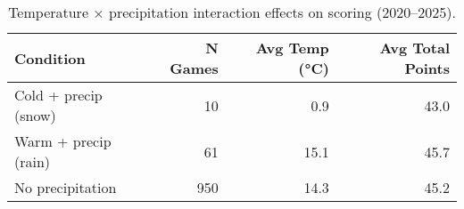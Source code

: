 \begin{table}[t]
  \centering
  \small
  \caption[Precipitation interaction effects]{Temperature × precipitation interaction effects on scoring (2020--2025).}
  \label{tab:precip-interaction}
  \setlength{\tabcolsep}{4pt}\renewcommand{\arraystretch}{1.12}
  \begin{tabular}{@{} l r r r @{} }
    \toprule
    \textbf{Condition}  & \textbf{N Games}  & \textbf{Avg Temp (°C)}  & \textbf{Avg Total Points} \\
    \midrule
    Cold + precip (snow) & 10 & 0.9 & 43.0 \\
    Warm + precip (rain) & 61 & 15.1 & 45.7 \\
    No precipitation & 950 & 14.3 & 45.2 \\
    \bottomrule
  \end{tabular}
\end{table}
